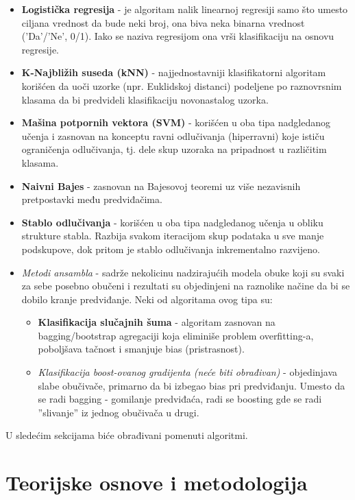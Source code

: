 \documentclass[fontsize=12bp, paper=a4]{scrarticle}
\begin{document}
\begin{itemize}
    \item \textbf{Logistička regresija} - je algoritam nalik linearnoj regresiji samo što umesto ciljana vrednost da bude neki broj, ona biva neka binarna vrednost ('Da'/'Ne', 0/1). Iako se naziva regresijom ona vrši klasifikaciju na osnovu regresije.
    \item \textbf{K-Najbližih suseda (kNN)} - najjednostavniji klasifikatorni algoritam korišćen da uoči uzorke (npr. Euklidskoj distanci) podeljene po raznovrsnim klasama da bi predvideli klasifikaciju novonastalog uzorka.
    \item \textbf{Mašina potpornih vektora (SVM)} - korišćen u oba tipa nadgledanog učenja i zasnovan na konceptu ravni odlučivanja (hiperravni) koje ističu ograničenja odlučivanja, tj. dele skup uzoraka na pripadnost u različitim klasama. 
    \item \textbf{Naivni Bajes} - zasnovan na Bajesovoj teoremi uz više nezavisnih pretpostavki među predviđačima.
    \item \textbf{Stablo odlučivanja} -  korišćen u oba tipa nadgledanog učenja u obliku strukture stabla. Razbija svakom iteracijom skup podataka u sve manje podskupove, dok pritom je stablo odlučivanja inkrementalno razvijeno. 
    \item \textit{Metodi ansambla} - sadrže nekolicinu nadzirajućih modela obuke koji su svaki za sebe posebno obučeni i rezultati su objedinjeni na raznolike načine da bi se dobilo kranje predviđanje. Neki od algoritama ovog tipa su:
    \begin{itemize}
        \item \textbf{Klasifikacija slučajnih šuma} - algoritam zasnovan na bagging/bootstrap agregaciji koja eliminiše problem overfitting-a, poboljšava tačnost i smanjuje bias (pristrasnost).
        \item \textit{Klasifikacija boost-ovanog gradijenta (neće biti obrađivan)} - objedinjava slabe obučivače, primarno da bi izbegao bias pri predviđanju. Umesto da se radi bagging - gomilanje predviđaća, radi se boosting gde se radi ''slivanje'' iz jednog obučivača u drugi.
    \end{itemize}
\end{itemize}
U sledećim sekcijama biće obrađivani pomenuti algoritmi.\cite{algs}
\newpage

\section{Teorijske osnove i metodologija}
\end{document}
